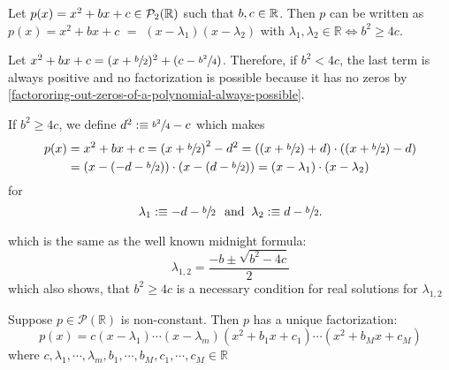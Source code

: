 \begin{thm} 
  \label{thm: factorization of a quadratic polynomial}
  Let $p(x)=x^2+bx+c \in \mathcal{P}_2(\mathbb{R})$ such that $b,c \in \mathbb{R}$. Then $p$ can be written as
  $p(x)=x^2 + bx + c$ $=$ $(x-\lambda_1)(x-\lambda_2)$ with $\lambda_1, \lambda_2 \in \mathbb{R} \iff b^2 \geq 4c$.
\end{thm}
\begin{prf}
  Let $x^2+bx+c=(x+\sfrac{b}{2})^2+(c-\sfrac{b^2}{4})$. Therefore, if $b^2<4c$, the last term is always positive and no factoriza\-tion is possible because it has no zeros by \ref{factororing-out-zeros-of-a-polynomial-always-possible}.
  
  If $b^2 \geq 4c$, we define $d^2 :\equiv \sfrac{b^2}{4}-c$ which makes
  \begin{equation}
	  \begin{aligned}
	    p(x)&=x^2+bx+c
		  = \left (x+\sfrac{b}{2} \right )^2-d^2
		  = \left ( (x+\sfrac{b}{2}) +d \right) \cdot \left ( (x+\sfrac{b}{2}) - d \right) \\
		  &= \left (x-(-d -\sfrac{b}{2}) \right) \cdot \left (x-(d-\sfrac{b}{2})\right)
		  =\left(x-\lambda_1 \right) \cdot \left(x-\lambda_2\right)
	  \end{aligned}
  \end{equation}
  for 
  \begin{equation}
    \lambda_1 :\equiv -d-\sfrac{b}{2} \;\;\, \text{and}\;\; \lambda_2 :\equiv d-\sfrac{b}{2}.
  \end{equation}
  
  which is the same as the well known midnight formula:
  \begin{equation}
    \lambda_{1,2} = \frac{-b \pm \sqrt{b^2-4c}}{2}
  \end{equation}
  which also shows, that $b^2 \geq 4c$ is a necessary condition for real solutions for $\lambda_{1,2}$
\end{prf}

\begin{thm}
  Suppose $p \in \mathcal{P}(\mathbb{R})$ is non-constant. Then $p$ has a unique factorization:
  \begin{equation}
    p(x) = c(x-\lambda_1) \cdots (x-\lambda_m)(x^2+b_1x+c_1) \cdots (x^2+b_Mx+c_M)
  \end{equation}
  where $c, \lambda_1, \cdots, \lambda_m, b_1, \cdots, b_M, c_1, \cdots, c_M \in \mathbb{R}$
\end{thm}


